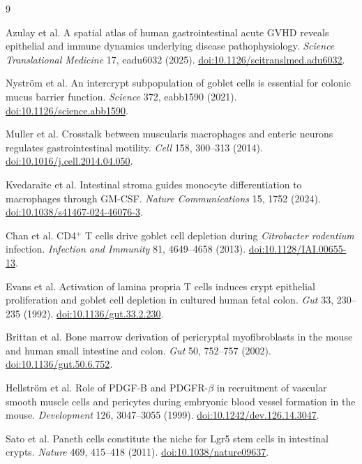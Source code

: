 \documentclass[10pt,a4paper]{article}
\begin{document}
\clearpage
\begin{thebibliography}{9}

Azulay et al. A spatial atlas of human gastrointestinal acute GVHD reveals epithelial and
immune dynamics underlying disease pathophysiology. \emph{Science Translational Medicine}
17, eadu6032 (2025). \href{https://doi.org/10.1126/scitranslmed.adu6032}{doi:10.1126/scitranslmed.adu6032}.

Nystr\"om et al. An intercrypt subpopulation of goblet cells is essential for colonic mucus
barrier function. \emph{Science} 372, eabb1590 (2021).
\href{https://doi.org/10.1126/science.abb1590}{doi:10.1126/science.abb1590}.

Muller et al. Crosstalk between muscularis macrophages and enteric neurons regulates
gastrointestinal motility. \emph{Cell} 158, 300--313 (2014).
\href{https://doi.org/10.1016/j.cell.2014.04.050}{doi:10.1016/j.cell.2014.04.050}.

Kvedaraite et al. Intestinal stroma guides monocyte differentiation to macrophages through
GM-CSF. \emph{Nature Communications} 15, 1752 (2024).
\href{https://doi.org/10.1038/s41467-024-46076-3}{doi:10.1038/s41467-024-46076-3}.

Chan et al. CD4$^+$ T cells drive goblet cell depletion during \emph{Citrobacter rodentium}
infection. \emph{Infection and Immunity} 81, 4649--4658 (2013).
\href{https://doi.org/10.1128/IAI.00655-13}{doi:10.1128/IAI.00655-13}.

Evans et al. Activation of lamina propria T cells induces crypt epithelial proliferation and
goblet cell depletion in cultured human fetal colon. \emph{Gut} 33, 230--235 (1992).
\href{https://doi.org/10.1136/gut.33.2.230}{doi:10.1136/gut.33.2.230}.

Brittan et al. Bone marrow derivation of pericryptal myofibroblasts in the mouse and human
small intestine and colon. \emph{Gut} 50, 752--757 (2002).
\href{https://doi.org/10.1136/gut.50.6.752}{doi:10.1136/gut.50.6.752}.

Hellstr\"om et al. Role of PDGF-B and PDGFR-$\beta$ in recruitment of vascular smooth muscle
cells and pericytes during embryonic blood vessel formation in the mouse.
\emph{Development} 126, 3047--3055 (1999).
\href{https://doi.org/10.1242/dev.126.14.3047}{doi:10.1242/dev.126.14.3047}.

Sato et al. Paneth cells constitute the niche for Lgr5 stem cells in intestinal crypts.
\emph{Nature} 469, 415--418 (2011).
\href{https://doi.org/10.1038/nature09637}{doi:10.1038/nature09637}.

\end{thebibliography}
\end{document}
